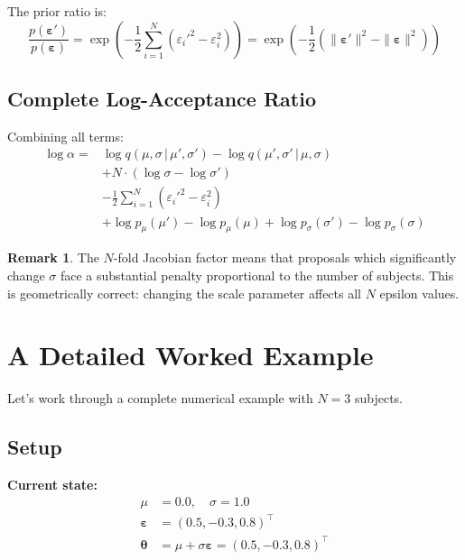 \documentclass[11pt,a4paper]{article}
\theoremstyle{definition}
\newtheorem{remark}[theorem]{Remark}
\newcommand{\eps}{\varepsilon}
\newcommand{\given}{\,|\,}
\begin{document}
The prior ratio is:
\begin{equation}
    \frac{p(\bm{\eps}')}{p(\bm{\eps})} = \exp\left(-\frac{1}{2}\sum_{i=1}^N (\eps_i'^2 - \eps_i^2)\right)
    = \exp\left(-\frac{1}{2}(\|\bm{\eps}'\|^2 - \|\bm{\eps}\|^2)\right)
\end{equation}

\subsection{Complete Log-Acceptance Ratio}

Combining all terms:
\begin{equation}
    \boxed{
    \begin{aligned}
    \log \alpha = {} & \log q(\mu, \sigma \given \mu', \sigma') - \log q(\mu', \sigma' \given \mu, \sigma) \\
    & + N \cdot (\log \sigma - \log \sigma') \\
    & - \frac{1}{2}\sum_{i=1}^N (\eps_i'^2 - \eps_i^2) \\
    & + \log p_\mu(\mu') - \log p_\mu(\mu) + \log p_\sigma(\sigma') - \log p_\sigma(\sigma)
    \end{aligned}
    }
    \label{eq:log_alpha_multi}
\end{equation}

\begin{remark}
The $N$-fold Jacobian factor means that proposals which significantly change $\sigma$
face a substantial penalty proportional to the number of subjects. This is geometrically
correct: changing the scale parameter affects all $N$ epsilon values.
\end{remark}

\section{A Detailed Worked Example}
\label{sec:worked_example}

Let's work through a complete numerical example with $N = 3$ subjects.

\subsection{Setup}

\textbf{Current state:}
\begin{align}
    \mu &= 0.0, \quad \sigma = 1.0 \\
    \bm{\eps} &= (0.5, -0.3, 0.8)^\top \\
    \bm{\theta} &= \mu + \sigma \bm{\eps} = (0.5, -0.3, 0.8)^\top
\end{align}
\end{document}
